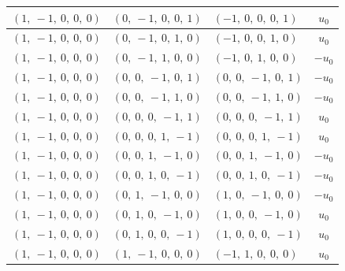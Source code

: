 \documentclass[11pt]{article}
\theoremstyle{definition}
\begin{document}
\begin{longtable}{|l|l|l|c|}
    \hline
    $\left( 1, \  -1, \  0, \  0, \  0\right)$ & $\left( 0, \  -1, \  0, \  0, \  1\right)$ & $\left( -1, \  0, \  0, \  0, \  1\right)$ & $u_{0}$ \\
    \hline
    $\left( 1, \  -1, \  0, \  0, \  0\right)$ & $\left( 0, \  -1, \  0, \  1, \  0\right)$ & $\left( -1, \  0, \  0, \  1, \  0\right)$ & $u_{0}$ \\
    \hline
    $\left( 1, \  -1, \  0, \  0, \  0\right)$ & $\left( 0, \  -1, \  1, \  0, \  0\right)$ & $\left( -1, \  0, \  1, \  0, \  0\right)$ & $- u_{0}$ \\
    \hline
    $\left( 1, \  -1, \  0, \  0, \  0\right)$ & $\left( 0, \  0, \  -1, \  0, \  1\right)$ & $\left( 0, \  0, \  -1, \  0, \  1\right)$ & $- u_{0}$ \\
    \hline
    $\left( 1, \  -1, \  0, \  0, \  0\right)$ & $\left( 0, \  0, \  -1, \  1, \  0\right)$ & $\left( 0, \  0, \  -1, \  1, \  0\right)$ & $- u_{0}$ \\
    \hline
    $\left( 1, \  -1, \  0, \  0, \  0\right)$ & $\left( 0, \  0, \  0, \  -1, \  1\right)$ & $\left( 0, \  0, \  0, \  -1, \  1\right)$ & $u_{0}$ \\
    \hline
    $\left( 1, \  -1, \  0, \  0, \  0\right)$ & $\left( 0, \  0, \  0, \  1, \  -1\right)$ & $\left( 0, \  0, \  0, \  1, \  -1\right)$ & $u_{0}$ \\
    \hline
    $\left( 1, \  -1, \  0, \  0, \  0\right)$ & $\left( 0, \  0, \  1, \  -1, \  0\right)$ & $\left( 0, \  0, \  1, \  -1, \  0\right)$ & $- u_{0}$ \\
    \hline
    $\left( 1, \  -1, \  0, \  0, \  0\right)$ & $\left( 0, \  0, \  1, \  0, \  -1\right)$ & $\left( 0, \  0, \  1, \  0, \  -1\right)$ & $- u_{0}$ \\
    \hline
    $\left( 1, \  -1, \  0, \  0, \  0\right)$ & $\left( 0, \  1, \  -1, \  0, \  0\right)$ & $\left( 1, \  0, \  -1, \  0, \  0\right)$ & $- u_{0}$ \\
    \hline
    $\left( 1, \  -1, \  0, \  0, \  0\right)$ & $\left( 0, \  1, \  0, \  -1, \  0\right)$ & $\left( 1, \  0, \  0, \  -1, \  0\right)$ & $u_{0}$ \\
    \hline
    $\left( 1, \  -1, \  0, \  0, \  0\right)$ & $\left( 0, \  1, \  0, \  0, \  -1\right)$ & $\left( 1, \  0, \  0, \  0, \  -1\right)$ & $u_{0}$ \\
    \hline
    $\left( 1, \  -1, \  0, \  0, \  0\right)$ & $\left( 1, \  -1, \  0, \  0, \  0\right)$ & $\left( -1, \  1, \  0, \  0, \  0\right)$ & $u_{0}$ \\

\end{longtable}
\end{document}
